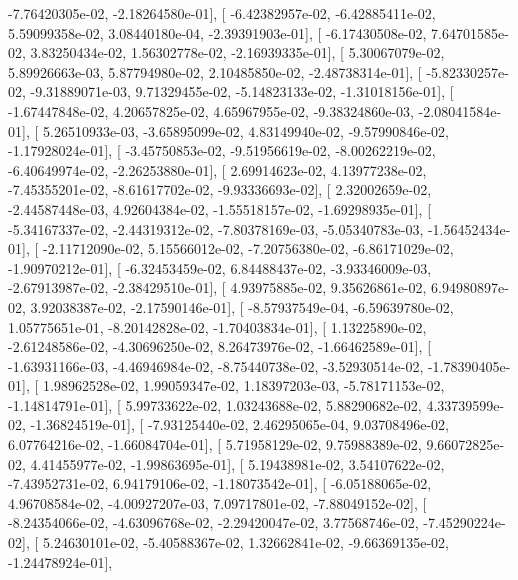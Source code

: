 \documentclass{article}
\begin{document}
         -7.76420305e-02,  -2.18264580e-01],
       [ -6.42382957e-02,  -6.42885411e-02,   5.59099358e-02,
          3.08440180e-04,  -2.39391903e-01],
       [ -6.17430508e-02,   7.64701585e-02,   3.83250434e-02,
          1.56302778e-02,  -2.16939335e-01],
       [  5.30067079e-02,   5.89926663e-03,   5.87794980e-02,
          2.10485850e-02,  -2.48738314e-01],
       [ -5.82330257e-02,  -9.31889071e-03,   9.71329455e-02,
         -5.14823133e-02,  -1.31018156e-01],
       [ -1.67447848e-02,   4.20657825e-02,   4.65967955e-02,
         -9.38324860e-03,  -2.08041584e-01],
       [  5.26510933e-03,  -3.65895099e-02,   4.83149940e-02,
         -9.57990846e-02,  -1.17928024e-01],
       [ -3.45750853e-02,  -9.51956619e-02,  -8.00262219e-02,
         -6.40649974e-02,  -2.26253880e-01],
       [  2.69914623e-02,   4.13977238e-02,  -7.45355201e-02,
         -8.61617702e-02,  -9.93336693e-02],
       [  2.32002659e-02,  -2.44587448e-03,   4.92604384e-02,
         -1.55518157e-02,  -1.69298935e-01],
       [ -5.34167337e-02,  -2.44319312e-02,  -7.80378169e-03,
         -5.05340783e-03,  -1.56452434e-01],
       [ -2.11712090e-02,   5.15566012e-02,  -7.20756380e-02,
         -6.86171029e-02,  -1.90970212e-01],
       [ -6.32453459e-02,   6.84488437e-02,  -3.93346009e-03,
         -2.67913987e-02,  -2.38429510e-01],
       [  4.93975885e-02,   9.35626861e-02,   6.94980897e-02,
          3.92038387e-02,  -2.17590146e-01],
       [ -8.57937549e-04,  -6.59639780e-02,   1.05775651e-01,
         -8.20142828e-02,  -1.70403834e-01],
       [  1.13225890e-02,  -2.61248586e-02,  -4.30696250e-02,
          8.26473976e-02,  -1.66462589e-01],
       [ -1.63931166e-03,  -4.46946984e-02,  -8.75440738e-02,
         -3.52930514e-02,  -1.78390405e-01],
       [  1.98962528e-02,   1.99059347e-02,   1.18397203e-03,
         -5.78171153e-02,  -1.14814791e-01],
       [  5.99733622e-02,   1.03243688e-02,   5.88290682e-02,
          4.33739599e-02,  -1.36824519e-01],
       [ -7.93125440e-02,   2.46295065e-04,   9.03708496e-02,
          6.07764216e-02,  -1.66084704e-01],
       [  5.71958129e-02,   9.75988389e-02,   9.66072825e-02,
          4.41455977e-02,  -1.99863695e-01],
       [  5.19438981e-02,   3.54107622e-02,  -7.43952731e-02,
          6.94179106e-02,  -1.18073542e-01],
       [ -6.05188065e-02,   4.96708584e-02,  -4.00927207e-03,
          7.09717801e-02,  -7.88049152e-02],
       [ -8.24354066e-02,  -4.63096768e-02,  -2.29420047e-02,
          3.77568746e-02,  -7.45290224e-02],
       [  5.24630101e-02,  -5.40588367e-02,   1.32662841e-02,
         -9.66369135e-02,  -1.24478924e-01],
\end{document}
